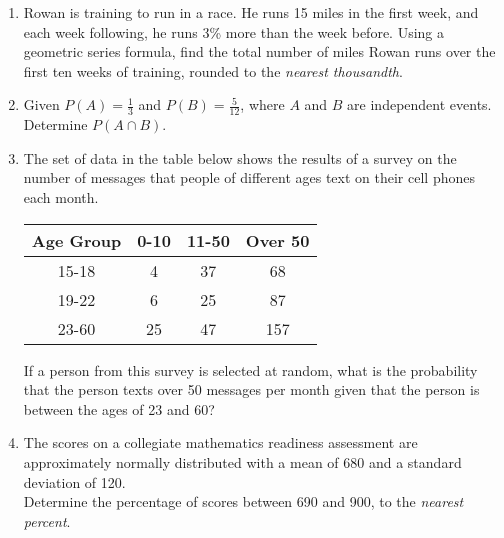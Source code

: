 \documentclass[12pt, twoside]{article}
\begin{document}
\begin{enumerate}[itemsep=0.5cm]
\item Rowan is training to run in a race. He runs 15 miles in the first week, and each week following, he runs 3\% more than the week before. Using a geometric series formula, find the total number of miles Rowan runs over the first ten weeks of training, rounded to the \emph{nearest thousandth}. %

\newpage
\item Given $P(A) = \frac{1}{3}$ and $P(B) = \frac{5}{12}$, where $A$ and $B$ are independent events. Determine $P(A \cap B)$. \vspace{3cm}

\item The set of data in the table below shows the results of a survey on the number of messages that people of different ages text on their cell phones each month.
\begin{center}
    \begin{tabular}{|c|c|c|c|}
        \hline
        Age Group & 0-10 & 11-50 & Over 50 \\
        \hline
        15-18 & 4 & 37 & 68 \\[0.25cm]
        \hline
        19-22 & 6 & 25 & 87 \\[0.25cm]
        \hline
        23-60 & 25 & 47 & 157 \\[0.25cm]
        \hline
    \end{tabular}
\end{center}
If a person from this survey is selected at random, what is the probability that the person texts over 50 messages per month given that the person is between the ages of 23 and 60?  \vspace{3cm}

\item The scores on a collegiate mathematics readiness assessment are approximately normally distributed with a mean of 680 and a standard deviation of 120.\\[0.5cm]
Determine the percentage of scores between 690 and 900, to the \emph{nearest percent}.\vspace{3cm}




\end{enumerate}
\end{document}
